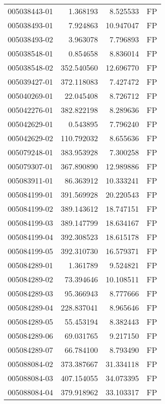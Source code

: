 \begin{tabular}{lrrl}
005038443-01 &    1.368193 &       8.525533 &   FP \\
005038493-01 &    7.924863 &      10.947047 &   FP \\
005038493-02 &    3.963078 &       7.796893 &   FP \\
005038548-01 &    0.854658 &       8.836014 &   FP \\
005038548-02 &  352.540560 &      12.696770 &   FP \\
005039427-01 &  372.118083 &       7.427472 &   FP \\
005040269-01 &   22.045408 &       8.726712 &   FP \\
005042276-01 &  382.822198 &       8.289636 &   FP \\
005042629-01 &    0.543895 &       7.796240 &   FP \\
005042629-02 &  110.792032 &       8.655636 &   FP \\
005079248-01 &  383.953928 &       7.300258 &   FP \\
005079307-01 &  367.890890 &      12.989886 &   FP \\
005083911-01 &   86.363912 &      10.333241 &   FP \\
005084199-01 &  391.569928 &      20.220543 &   FP \\
005084199-02 &  389.143612 &      18.747151 &   FP \\
005084199-03 &  389.147799 &      18.634167 &   FP \\
005084199-04 &  392.308523 &      18.615178 &   FP \\
005084199-05 &  392.310730 &      16.579371 &   FP \\
005084289-01 &    1.361789 &       9.524821 &   FP \\
005084289-02 &   73.394646 &      10.108511 &   FP \\
005084289-03 &   95.366943 &       8.777666 &   FP \\
005084289-04 &  228.837041 &       8.965646 &   FP \\
005084289-05 &   55.453194 &       8.382443 &   FP \\
005084289-06 &   69.031765 &       9.217150 &   FP \\
005084289-07 &   66.784100 &       8.793490 &   FP \\
005088084-02 &  373.387667 &      31.334118 &   FP \\
005088084-03 &  407.154055 &      34.073395 &   FP \\
005088084-04 &  379.918962 &      33.103317 &   FP \\

\end{tabular}

